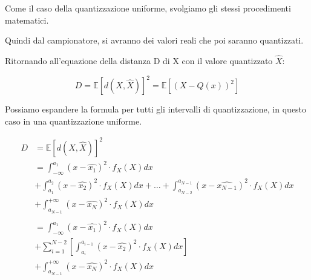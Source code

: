Come il caso della quantizzazione uniforme, svolgiamo gli stessi procedimenti matematici. \newline 

Quindi dal campionatore, si avranno dei valori reali che poi saranno quantizzati. \newline 

Ritornando all'equazione della distanza D di X con il valore quantizzato $\hat{X}$: 

{
    \Large 
    \begin{equation}
         D 
            =
            \mathbb{E} 
            \left[d (X , \hat{X}) \right]^{2}
            = 
            \mathbb{E} 
            \left[ (X - Q(x) )^{2} \right] 
    \end{equation}
}

Possiamo espandere la formula per tutti gli intervalli di quantizzazione, in questo caso in una quantizzazione uniforme. \newline 

{
    \Large
    \begin{equation}
        \begin{split}
            D 
            &=
            \mathbb{E} 
            \left[d (X , \hat{X}) \right]^{2}
            \\
            &=  
            \int_{- \infty}^{a_1}
            (x - \hat{x_1})^{2} \cdot f_X (X) dx 
            \\
            &+ 
            \int_{a_1}^{a_2}
            (x - \hat{x_2})^{2} \cdot f_X (X) dx 
            + 
            \dots
            +
            \int_{a_{N-2}}^{a_{N-1}}
            (x - \hat{x_{N-1}})^{2} \cdot f_X (X) dx 
            \\
            &+
            \int_{a_{N-1}}^{+ \infty}
            (x - \hat{x_{N}})^{2} \cdot f_X (X) dx  
            \\
            &\quad
            \\
            &=
            \int_{- \infty}^{a_1}
            (x - \hat{x_1})^{2} \cdot f_X (X) dx 
            \\
            &+ 
            \sum_{i = 1}^{N - 2}
            \left[
            \int_{a_i}^{a_{i-1}}
            (x - \hat{x_2})^{2} \cdot f_X (X) dx 
            \right]
            \\
            &+
            \int_{a_{N-1}}^{+ \infty}
            (x - \hat{x_{N}})^{2} \cdot f_X (X) dx  
        \end{split}
    \end{equation}
}

